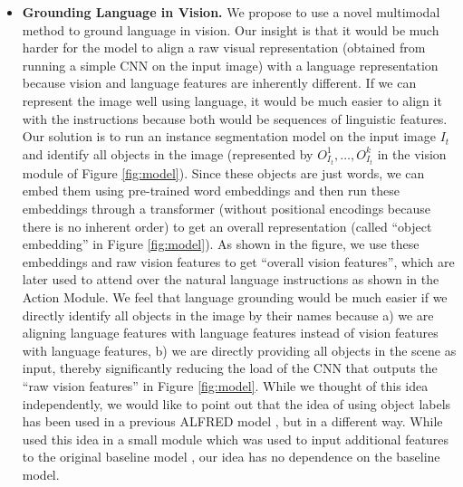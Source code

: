 \documentclass[11pt,a4paper]{article}
\begin{document}
\begin{itemize}
    \item \textbf{Grounding Language in Vision.} We propose to use a novel multimodal method to ground language in vision. Our insight is that it would be much harder for the model to align a raw visual representation (obtained from running a simple CNN on the input image) with a language representation because vision and language features are inherently different. If we can represent the image well using language, it would be much easier to align it with the instructions because both would be sequences of linguistic features. Our solution is to run an instance segmentation model on the input image $I_t$ and identify all objects in the image (represented by $O_{I_t}^1, \dots, O_{I_t}^k$ in the vision module of Figure \ref{fig:model}). Since these objects are just words, we can embed them using pre-trained word embeddings and then run these embeddings through a transformer (without positional encodings because there is no inherent order) to get an overall representation (called ``object embedding'' in Figure \ref{fig:model}). As shown in the figure, we use these embeddings and raw vision features to get ``overall vision features'', which are later used to attend over the natural language instructions as shown in the Action Module. We feel that language grounding would be much easier if we directly identify all objects in the image by their names because a) we are aligning language features with language features instead of vision features with language features, b) we are directly providing all objects in the scene as input, thereby significantly reducing the load of the CNN that outputs the ``raw vision features'' in Figure \ref{fig:model}. While we thought of this idea independently, we would like to point out that the idea of using object labels has been used in a previous ALFRED model \cite{Storks2021AreWT}, but in a different way. While  used this idea in a small module which was used to input additional features to the original baseline model \cite{shridhar2020alfred}, our idea has no dependence on the baseline model.


\end{itemize}
\end{document}
